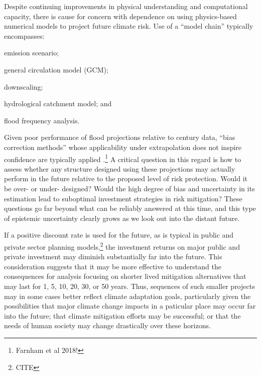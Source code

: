 \documentclass[12pt]{article}
\begin{document}
Despite continuing improvements in physical understanding and computational capacity, there is cause for concern with dependence on using physics-based numerical models to project future climate risk.
Use of a ``model chain'' typically encompasses:
\begin{enumerate*}[label= (\roman*) ]
  \item emission scenario;
  \item general circulation model (GCM);
  \item downscaling;
  \item hydrological catchment model; and
  \item flood frequency analysis.
\end{enumerate*}
Given poor performance of flood projections relative to  century data, ``bias correction methods'' whose applicability under extrapolation does not inspire confidence are typically applied \citep{Dankers2009,Ott2013,Merz2014,Dittes2017}.\footnote{Farnham et al 2018!}
A critical question in this regard is how to assess whether any structure designed using these projections may actually perform in the future relative to the proposed level of risk protection.
Would it be over- or under- designed?
Would the high degree of bias and uncertainty in its estimation lead to suboptimal investment strategies in risk mitigation?
These questions go far beyond what can be reliably answered at this time, and this type of epistemic uncertainty clearly grows as we look out into the distant future.

If a positive discount rate is used for the future, as is typical in public and private sector planning models,\footnote{CITE} the investment returns on major public and private investment may diminish substantially far into the future.
This consideration suggests that it may be more effective to understand the consequences for analysis focusing on shorter lived mitigation alternatives that may last for 1, 5, 10, 20, 30, or 50 years.
Thus, sequences of such smaller projects may in some cases better reflect climate adaptation goals, particularly given the possibilities that major climate change impacts in a paticular place may occur far into the future; that climate mitigation efforts may be successful; or that the needs of human society may change drastically over these horizons.
\end{document}
